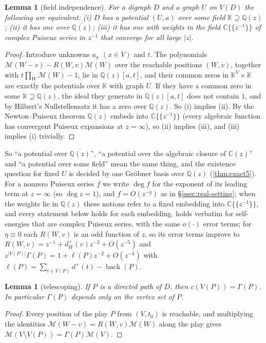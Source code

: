 \documentclass[11pt]{amsart}
\theoremstyle{plain}
\newtheorem{lemma}[theorem]{Lemma}
\theoremstyle{definition}
\theoremstyle{remark}
\numberwithin{equation}{section}
\newcommand{\QQ}{\mathbb{Q}}
\newcommand{\CC}{\mathbb{C}}
\newcommand{\Qz}{\QQ(z)}
\newcommand{\Qzbar}{\overline{\QQ(z)}}
\newcommand{\Mpot}{\mathcal{M}}           %
\newcommand{\back}{\operatorname{back}}
\begin{document}
\begin{lemma}[field independence]\label{lem:field-independence}
For a digraph $D$ and a graph $U$ on $V(D)$ the following are equivalent: \textup{(i)} $D$ has a potential $(U,a)$ over some field $\mathbb K\supseteq\Qz$; \textup{(ii)} it has one over $\Qzbar$; \textup{(iii)} it has one with weights in the field $\CC\{\!\{z^{-1}\}\!\}$ of complex Puiseux series in $z^{-1}$ that converge for all large $|z|$.
\end{lemma}
\begin{proof}
Introduce unknowns $a_x$ $(x\in V)$ and $t$. The polynomials $\Mpot(W-v)-R(W,v)\Mpot(W)$ over the reachable positions $(W,v)$, together with $t\prod_W\Mpot(W)-1$, lie in $\Qz[a,t]$, and their common zeros in $\mathbb K^{V}\times\mathbb K$ are exactly the potentials over $\mathbb K$ with graph $U$. If they have a common zero in some $\mathbb K\supseteq\Qz$, the ideal they generate in $\Qz[a,t]$ does not contain $1$, and by Hilbert's Nullstellensatz it has a zero over $\Qzbar$. So (i) implies (ii). By the Newton--Puiseux theorem $\Qzbar$ embeds into $\CC\{\!\{z^{-1}\}\!\}$ (every algebraic function has convergent Puiseux expansions at $z=\infty$), so (ii) implies (iii), and (iii) implies (i) trivially.
\end{proof}

So ``a potential over $\Qzbar$'', ``a potential over the algebraic closure of $\CC(z)$'' and ``a potential over some field'' mean the same thing, and the existence question for fixed $U$ is decided by one Gr\"obner basis over $\Qz$ (\cref{thm:exact5}). For a nonzero Puiseux series $f$ we write $\deg f$ for the exponent of its leading term at $z=\infty$ (so $\deg z=1$), and $f=O(z^{-q})$ as in \S\ref{ssec:real-setting}; when the weights lie in $\Qzbar$ these notions refer to a fixed embedding into $\CC\{\!\{z^{-1}\}\!\}$, and every statement below holds for each embedding.  holds verbatim for self-energies that are complex Puiseux series, with the same $o(\cdot)$ error terms; for $\eta\equiv0$ each $R(W,v)$ is an odd function of $z$, so its error terms improve to $R(W,v)=z^{-1}+d^{+}_W(v)z^{-3}+O(z^{-5})$ and $z^{|V(P)|}\Gamma(P)=1+\ell(P)z^{-2}+O(z^{-4})$ with $\ell(P)=\sum_{t\in V(P)}d^{+}(t)-\back(P)$.

\begin{lemma}[telescoping]\label{lem:telescoping}
If $P$ is a directed path of $D$, then $c(V(P))=\Gamma(P)$. In particular $\Gamma(P)$ depends only on the vertex set of $P$.
\end{lemma}
\begin{proof}
Every position of the play $P$ from $(V,t_0)$ is reachable, and multiplying the identities $\Mpot(W-v)=R(W,v)\Mpot(W)$ along the play gives $\Mpot(V\setminus V(P))=\Gamma(P)\Mpot(V)$.
\end{proof}
\end{document}
